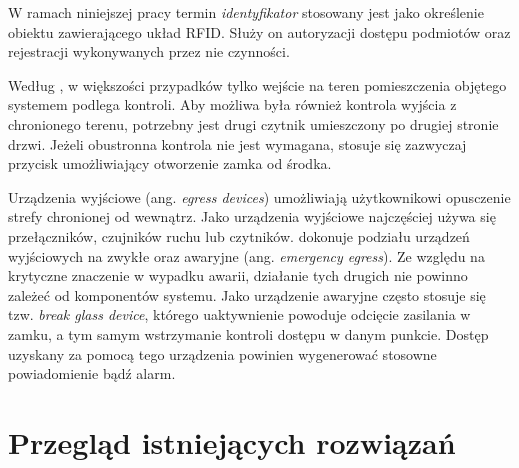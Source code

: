 		W ramach niniejszej pracy termin \textit{identyfikator} stosowany jest jako określenie obiektu zawierającego układ RFID. Służy on autoryzacji dostępu podmiotów oraz rejestracji wykonywanych przez nie czynności.

		Według \cite{bsia2016}, w większości przypadków tylko wejście na teren pomieszczenia objętego systemem podlega kontroli. Aby możliwa była również kontrola wyjścia z chronionego terenu, potrzebny jest drugi czytnik umieszczony po drugiej stronie drzwi. Jeżeli obustronna kontrola nie jest wymagana, stosuje się zazwyczaj przycisk umożliwiający otworzenie zamka od środka.

		Urządzenia wyjściowe (ang. \textit{egress devices}) umożliwiają użytkownikowi opusczenie strefy chronionej od wewnątrz. Jako urządzenia wyjściowe najczęściej używa się przełączników, czujników ruchu lub czytników. \cite{bsia2016} dokonuje podziału urządzeń wyjściowych na zwykłe oraz awaryjne (ang. \textit{emergency egress}). Ze względu na krytyczne znaczenie w wypadku awarii, działanie tych drugich nie powinno zależeć od komponentów systemu. Jako urządzenie awaryjne często stosuje się tzw. \textit{break glass device}, którego uaktywnienie powoduje odcięcie zasilania w zamku, a tym samym wstrzymanie kontroli dostępu w danym punkcie. Dostęp uzyskany za pomocą tego urządzenia powinien wygenerować stosowne powiadomienie bądź alarm.

	\section{Przegląd istniejących rozwiązań}

